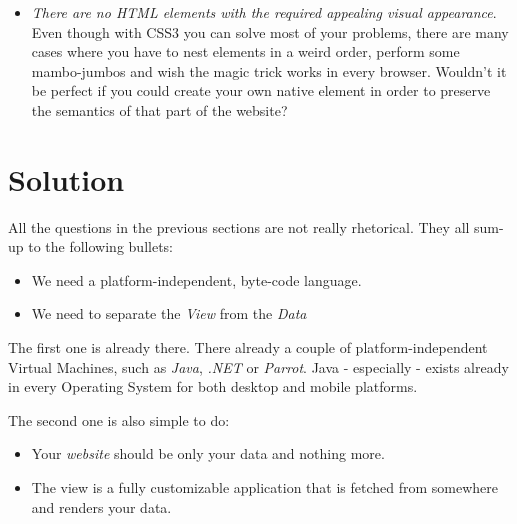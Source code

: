 \documentclass[a4paper]{article}
\begin{document}
\begin{itemize}
  \item \emph{There are no HTML elements with the required appealing visual appearance}. Even though with CSS3 you can solve most of your problems, there are many cases where you have to nest elements in a weird order, perform some mambo-jumbos and wish the magic trick works in every browser. Wouldn't it be perfect if you could create your own native element in order to preserve the semantics of that part of the website?
\end{itemize}

\section{Solution}
All the questions in the previous sections are not really rhetorical. They all sum-up to the following bullets:

\begin{itemize}
  \item We need a platform-independent, byte-code language.
  \item We need to separate the \emph{View} from the \emph{Data}
\end{itemize}

The first one is already there. There already a couple of platform-independent Virtual Machines, such as \emph{Java}, \emph{.NET} or \emph{Parrot}. Java - especially - exists already in every Operating System for both desktop and mobile platforms.

The second one is also simple to do:
\begin{itemize}
  \item Your \emph{website} should be only your data and nothing more. 
  \item The view is a fully customizable application that is fetched from somewhere and renders your data.
\end{itemize}


\end{document}
